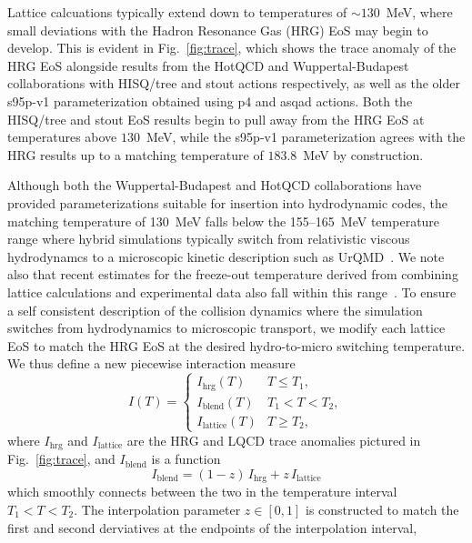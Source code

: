 \documentclass[aps,prc,reprint,amsmath,nofootinbib,superscriptaddress]{revtex4-1}
\begin{document}
Lattice calcuations typically extend down to temperatures of ${\sim}130$~MeV, where small deviations with the Hadron Resonance Gas (HRG) EoS may begin to develop.
This is evident in Fig.~\ref{fig:trace}, which shows the trace anomaly of the HRG EoS alongside results from the HotQCD and Wuppertal-Budapest collaborations with HISQ/tree and stout actions respectively, as well as the older s95p-v1 parameterization obtained using p4 and asqad actions.  
Both the HISQ/tree and stout EoS results begin to pull away from the HRG EoS at temperatures above $130$~MeV, while the s95p-v1 parameterization agrees with the HRG results up to a matching temperature of $183.8$~MeV by construction.

Although both the Wuppertal-Budapest and HotQCD collaborations have provided parameterizations suitable for insertion into hydrodynamic codes, the matching temperature of 130~MeV falls below the 155--165~MeV temperature range where hybrid simulations typically switch from relativistic viscous hydrodynamcs to a microscopic kinetic description such as UrQMD~\cite{Bass:1998ca,Bleicher:1999xi}.  
We note also that recent estimates for the freeze-out temperature derived from combining lattice calculations and experimental data also fall within this range~\cite{Bazavov:2014xya, Adare:2015aqk}.  
To ensure a self consistent description of the collision dynamics where the simulation switches from hydrodynamics to microscopic transport, we modify each lattice EoS to match the HRG EoS at the desired hydro-to-micro switching temperature. We thus define a new piecewise interaction measure
\begin{equation}
 \label{interaction}
 I(T) =
  \begin{cases}
   I_\text{hrg}(T)	& T \le T_1, \\
   I_\text{blend}(T)	& T_1 < T < T_2, \\ 
   I_\text{lattice}(T)	& T \ge T_2,
  \end{cases}
\end{equation}
where $I_\text{hrg}$ and $I_\text{lattice}$ are the HRG and LQCD trace anomalies pictured in Fig.~\ref{fig:trace}, and $I_\text{blend}$ is a function 
\begin{equation}
  \label{interpolation}
  I_\text{blend} = (1-z)\, I_\text{hrg} + z\, I_\text{lattice}
\end{equation}
which smoothly connects between the two in the temperature interval $T_1 < T < T_2$. The interpolation parameter $z \in [0,1]$ is constructed to match the first and second derviatives at the endpoints of the interpolation interval,
\end{document}
